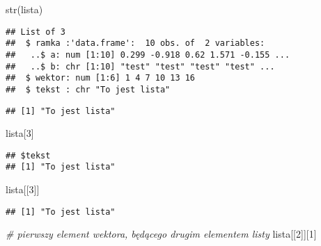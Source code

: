 \documentclass[
]{book}
\newenvironment{Shaded}{\begin{snugshade}}{\end{snugshade}}
\newcommand{\CommentTok}[1]{\textcolor[rgb]{0.56,0.35,0.01}{\textit{#1}}}
\newcommand{\DecValTok}[1]{\textcolor[rgb]{0.00,0.00,0.81}{#1}}
\newcommand{\FunctionTok}[1]{\textcolor[rgb]{0.00,0.00,0.00}{#1}}
\newcommand{\NormalTok}[1]{#1}
\newcommand{\SpecialCharTok}[1]{\textcolor[rgb]{0.00,0.00,0.00}{#1}}
\begin{document}
\begin{Shaded}
\begin{Highlighting}[]
\FunctionTok{str}\NormalTok{(lista)}
\end{Highlighting}
\end{Shaded}

\begin{verbatim}
## List of 3
##  $ ramka :'data.frame':  10 obs. of  2 variables:
##   ..$ a: num [1:10] 0.299 -0.918 0.62 1.571 -0.155 ...
##   ..$ b: chr [1:10] "test" "test" "test" "test" ...
##  $ wektor: num [1:6] 1 4 7 10 13 16
##  $ tekst : chr "To jest lista"
\end{verbatim}

\begin{Shaded}
\end{Shaded}

\begin{verbatim}
## [1] "To jest lista"
\end{verbatim}

\begin{Shaded}
\begin{Highlighting}[]
\NormalTok{lista[}\DecValTok{3}\NormalTok{]}
\end{Highlighting}
\end{Shaded}

\begin{verbatim}
## $tekst
## [1] "To jest lista"
\end{verbatim}

\begin{Shaded}
\begin{Highlighting}[]
\NormalTok{lista[[}\DecValTok{3}\NormalTok{]]}
\end{Highlighting}
\end{Shaded}

\begin{verbatim}
## [1] "To jest lista"
\end{verbatim}

\begin{Shaded}
\begin{Highlighting}[]
\CommentTok{\# pierwszy element wektora, będącego drugim elementem listy}
\NormalTok{lista[[}\DecValTok{2}\NormalTok{]][}\DecValTok{1}\NormalTok{]}
\end{Highlighting}
\end{Shaded}
\end{document}
